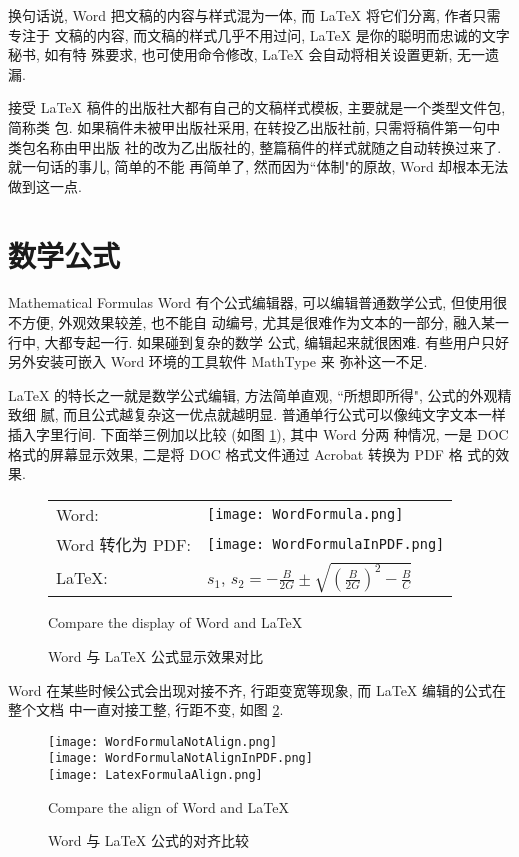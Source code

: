 换句话说, Word 把文稿的内容与样式混为一体, 而 \LaTeX{}\index{\LaTeX} 将它们分离, 作者只需专注于
文稿的内容, 而文稿的样式几乎不用过问, \LaTeX{}\index{\LaTeX} 是你的聪明而忠诚的文字秘书, 如有特
殊要求, 也可使用命令修改, \LaTeX{}\index{\LaTeX} 会自动将相关设置更新, 无一遗漏.

接受 \LaTeX{}\index{\LaTeX} 稿件的出版社大都有自己的文稿样式模板, 主要就是一个类型文件包, 简称类
包. 如果稿件未被甲出版社采用, 在转投乙出版社前, 只需将稿件第一句中类包名称由甲出版
社的改为乙出版社的, 整篇稿件的样式就随之自动转换过来了. 就一句话的事儿, 简单的不能
再简单了, 然而因为``体制"的原故, Word 却根本无法做到这一点.

\section{数学公式}{Mathematical Formulas}
Word 有个公式编辑器, 可以编辑普通数学公式, 但使用很不方便, 外观效果较差, 也不能自
动编号, 尤其是很难作为文本的一部分, 融入某一行中, 大都专起一行. 如果碰到复杂的数学
公式, 编辑起来就很困难. 有些用户只好另外安装可嵌入 Word 环境的工具软件 MathType 来
弥补这一不足.

\LaTeX{}\index{\LaTeX} 的特长之一就是数学公式编辑, 方法简单直观, ``所想即所得", 公式的外观精致细
腻, 而且公式越复杂这一优点就越明显. 普通单行公式可以像纯文字文本一样插入字里行间.
下面举三例加以比较 (如图 \ref{fig:CompareTheDisplayOfWordAndLaTeX}), 其中 Word 分两
种情况, 一是 DOC 格式的屏幕显示效果, 二是将 DOC 格式文件通过 Acrobat 转换为 PDF 格
式的效果.

\begin{figure}
  \centering
  \begin{tabu}to.7\linewidth{X[1rm]X[1.5lm]}
    Word: & \texttt{[image: WordFormula.png]}\\
    Word 转化为 PDF: & \texttt{[image: WordFormulaInPDF.png]}\\
    \LaTeX{}: & $s_1$, $\displaystyle s_2=-\frac{B}{2G}\pm\sqrt{\left(\frac{B}{2G}\right)^2-\frac{B}{C}}$\\
  \end{tabu}
  \caption{Word 与 \LaTeX{}\index{\LaTeX} 公式显示效果对比}{Compare the display of Word and \LaTeX}
  \label{fig:CompareTheDisplayOfWordAndLaTeX}
\end{figure}

Word 在某些时候公式会出现对接不齐, 行距变宽等现象, 而 \LaTeX{}\index{\LaTeX} 编辑的公式在整个文档
中一直对接工整, 行距不变, 如图 \ref{fig:CompareTheAlignOfWordAndLaTeX}.

\begin{figure}
 \centering
 \texttt{[image: WordFormulaNotAlign.png]}\\
 \texttt{[image: WordFormulaNotAlignInPDF.png]}\\
 \texttt{[image: LatexFormulaAlign.png]}\\
 \caption{Word 与 \LaTeX{}\index{\LaTeX} 公式的对齐比较}{Compare the align of Word and \LaTeX{}}
 \label{fig:CompareTheAlignOfWordAndLaTeX}
\end{figure}

